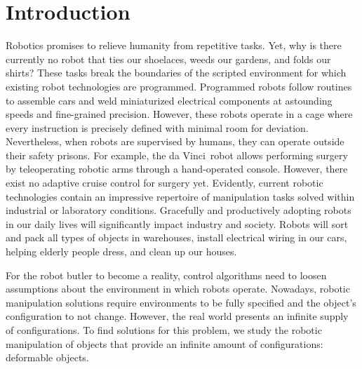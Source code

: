 \documentclass[\home/main.tex]{subfiles}
\begin{document}
\chapter{Introduction}\label{ch:introduction}

Robotics promises to relieve humanity from repetitive tasks. Yet, why is there currently no robot that ties our shoelaces, weeds our gardens, and folds our shirts?
These tasks break the boundaries of the scripted environment for which existing robot technologies are programmed. Programmed robots follow routines to assemble cars and weld miniaturized electrical components at astounding speeds and fine-grained precision. However, these robots operate in a cage where every instruction is precisely defined with minimal room for deviation. Nevertheless, when robots are supervised by humans, they can operate outside their safety prisons. For example, the da Vinci\textregistered\ robot allows performing surgery by teleoperating robotic arms through a hand-operated console. However, there exist no adaptive cruise control for surgery yet.
Evidently, current robotic technologies contain an impressive repertoire of manipulation tasks solved within industrial or laboratory conditions.
Gracefully and productively adopting robots in our daily lives will significantly impact industry and society. Robots will sort and pack all types of objects in warehouses, install electrical wiring in our cars, helping elderly people dress, and clean up our houses.

For the robot butler to become a reality, control algorithms need to loosen assumptions about the environment in which robots operate. Nowadays, robotic manipulation solutions require environments to be fully specified and the object's configuration to not change. However, the real world presents an infinite supply of configurations. To find solutions for this problem, we study the robotic manipulation of objects that provide an infinite amount of configurations: deformable objects.
\end{document}
